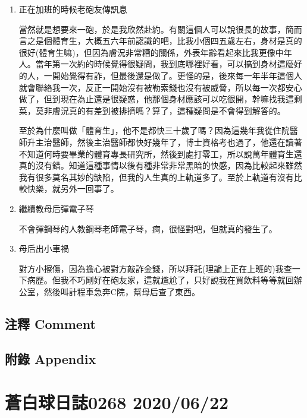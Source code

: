 \documentclass[a5paper, 11pt
]{book}
\begin{document}
\begin{enumerate}
\def\labelenumi{\arabic{enumi}.}
\item
  正在加班的時候老砲友傳訊息

  當然就是想要來一砲，於是我欣然赴約。有關這個人可以說很長的故事，簡而言之是個體育生，大概五六年前認識的吧，比我小個四五歲左右，身材是真的很好(體育生嘛)，但因為膚況非常糟的關係，外表年齡看起來比我更像中年人。當年第一次約的時候覺得很疑問，我到底哪裡好看，可以搞到身材這麼好的人，一開始覺得有詐，但最後還是做了。更怪的是，後來每一年半年這個人就會聯絡我一次，反正一開始沒有被勒索錢也沒有被威脅，所以每一次都安心做了，但到現在為止還是很疑惑，他那個身材應該可以吃很開，幹嘛找我這剩菜，莫非膚況真的有差到被排擠嗎？算了，這種疑問是不會得到解答的。

  至於為什麼叫做「體育生」，他不是都快三十歲了嗎？因為這幾年我從住院醫師升主治醫師，然後主治醫師都快好幾年了，博士資格考也過了，他還在讀著不知道何時要畢業的體育專長研究所，然後到處打零工，所以說萬年體育生還真的沒有錯。知道這種事情以後有種非常非常黑暗的快感，因為比較起來雖然我有很多莫名其妙的缺陷，但我的人生真的上軌道多了。至於上軌道有沒有比較快樂，就另外一回事了。
\item
  繼續教母后彈電子琴

  不會彈鋼琴的人教鋼琴老師電子琴，痾，很怪對吧，但就真的發生了。
\item
  母后出小車禍

  對方小擦傷，因為擔心被對方敲詐金錢，所以拜託(理論上正在上班的)我查一下病歷。但我不巧剛好在砲友家，這就尷尬了，只好說我在買飲料等等就回辦公室，然後叫計程車急奔C院，幫母后查了東西。
\end{enumerate}

\hypertarget{ux6ce8ux91cb-comment-20}{%
\subsection{注釋 Comment}\label{ux6ce8ux91cb-comment-20}}

\hypertarget{ux9644ux9304-appendix-20}{%
\subsection{附錄 Appendix}\label{ux9644ux9304-appendix-20}}

\hypertarget{ux84bcux767dux7403ux65e5ux8a8c0268-20200622}{%
\section{蒼白球日誌0268
2020/06/22}\label{ux84bcux767dux7403ux65e5ux8a8c0268-20200622}}
\end{document}
